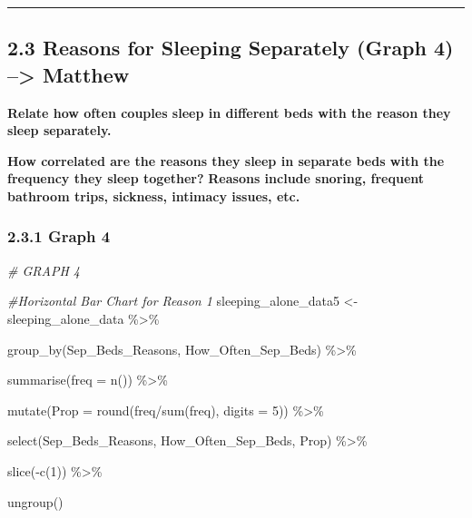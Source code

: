 \documentclass[
]{article}
\newenvironment{Shaded}{\begin{snugshade}}{\end{snugshade}}
\newcommand{\AttributeTok}[1]{\textcolor[rgb]{0.77,0.63,0.00}{#1}}
\newcommand{\CommentTok}[1]{\textcolor[rgb]{0.56,0.35,0.01}{\textit{#1}}}
\newcommand{\DecValTok}[1]{\textcolor[rgb]{0.00,0.00,0.81}{#1}}
\newcommand{\FunctionTok}[1]{\textcolor[rgb]{0.00,0.00,0.00}{#1}}
\newcommand{\NormalTok}[1]{#1}
\newcommand{\OtherTok}[1]{\textcolor[rgb]{0.56,0.35,0.01}{#1}}
\newcommand{\SpecialCharTok}[1]{\textcolor[rgb]{0.00,0.00,0.00}{#1}}
\begin{document}
\begin{center}\rule{0.5\linewidth}{0.5pt}\end{center}

\hypertarget{reasons-for-sleeping-separately-graph-4-matthew}{%
\subsection{2.3 Reasons for Sleeping Separately (Graph 4)
--\textgreater{}
Matthew}\label{reasons-for-sleeping-separately-graph-4-matthew}}

\textbf{Relate how often couples sleep in different beds with the reason
they sleep separately.}

\textbf{How correlated are the reasons they sleep in separate beds with
the frequency they sleep together?} \textbf{Reasons include snoring,
frequent bathroom trips, sickness, intimacy issues, etc.}

\hypertarget{graph-4}{%
\subsubsection{2.3.1 Graph 4}\label{graph-4}}

\begin{Shaded}
\begin{Highlighting}[]
\CommentTok{\# GRAPH 4}

\CommentTok{\#Horizontal Bar Chart for Reason 1}
\NormalTok{sleeping\_alone\_data5 }\OtherTok{\textless{}{-}}\NormalTok{ sleeping\_alone\_data }\SpecialCharTok{\%\textgreater{}\%} 
  
  \FunctionTok{group\_by}\NormalTok{(Sep\_Beds\_Reasons, How\_Often\_Sep\_Beds) }\SpecialCharTok{\%\textgreater{}\%} 
  
  \FunctionTok{summarise}\NormalTok{(}\AttributeTok{freq =} \FunctionTok{n}\NormalTok{()) }\SpecialCharTok{\%\textgreater{}\%} 
  
  \FunctionTok{mutate}\NormalTok{(}\AttributeTok{Prop =} \FunctionTok{round}\NormalTok{(freq}\SpecialCharTok{/}\FunctionTok{sum}\NormalTok{(freq), }\AttributeTok{digits =} \DecValTok{5}\NormalTok{)) }\SpecialCharTok{\%\textgreater{}\%} 
  
  \FunctionTok{select}\NormalTok{(Sep\_Beds\_Reasons, How\_Often\_Sep\_Beds, Prop) }\SpecialCharTok{\%\textgreater{}\%} 
  
  \FunctionTok{slice}\NormalTok{(}\SpecialCharTok{{-}}\FunctionTok{c}\NormalTok{(}\DecValTok{1}\NormalTok{)) }\SpecialCharTok{\%\textgreater{}\%} 
  
  \FunctionTok{ungroup}\NormalTok{()}
\end{Highlighting}
\end{Shaded}
\end{document}
